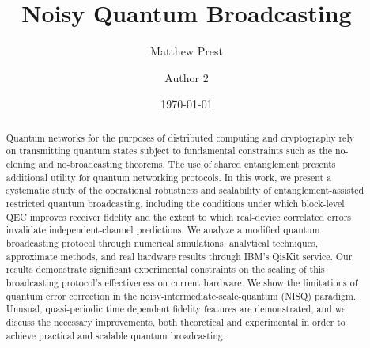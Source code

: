 \title{Noisy Quantum Broadcasting}


\author{Matthew Prest}

\author{Author 2}



\date{\today}

\begin{abstract}
Quantum networks for the purposes of distributed computing and cryptography rely on transmitting quantum states subject to fundamental constraints such as the no-cloning and no-broadcasting theorems. The use of shared entanglement presents additional utility for quantum networking protocols. In this work, we present a systematic study of the operational robustness and scalability of entanglement-assisted restricted quantum broadcasting, including the conditions under which block-level QEC improves receiver fidelity and the extent to which real-device correlated errors invalidate independent-channel predictions. We analyze a modified quantum broadcasting protocol through numerical simulations, analytical techniques, approximate methods, and real hardware results through IBM's QisKit service. Our results demonstrate significant experimental constraints on the scaling of this broadcasting protocol's effectiveness on current hardware. We show the limitations of quantum error correction in the noisy-intermediate-scale-quantum (NISQ) paradigm. Unusual, quasi-periodic time dependent fidelity features are demonstrated, and we discuss the necessary improvements, both theoretical and experimental in order to achieve practical and scalable quantum broadcasting.
\end{abstract}

